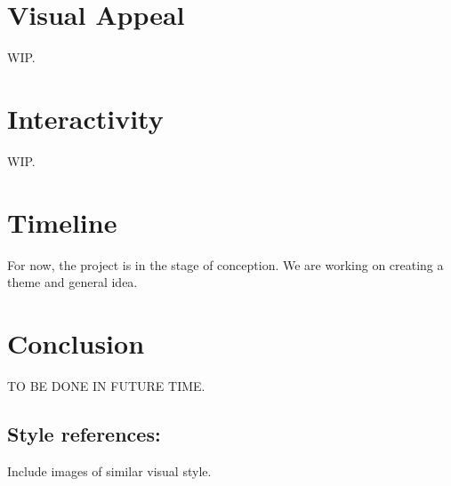 \documentclass[a4paper,12pt]{article}
\begin{document}
\section*{Visual Appeal}
WIP.

\section*{Interactivity}
WIP.

\section*{Timeline}
For now, the project is in the stage of conception. We are working on creating a theme and general idea.

\section*{Conclusion}
TO BE DONE IN FUTURE TIME.

\subsection*{Style references:}
Include images of similar visual style.
\end{document}
